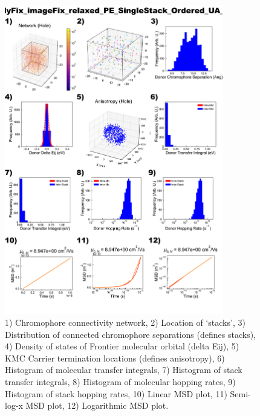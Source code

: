 \documentclass[12pt]{article}
\begin{document}
\begin{figure}[h]\centering
	\includegraphics[width=0.85\textwidth]{Figures/PE_SingleStack_Ordered.png}
    \caption{   1) Chromophore connectivity network, 
                2) Location of `stacks', 
                3) Distribution of connected chromophore separations (defines stacks),
                4) Density of states of Frontier molecular orbital (delta Eij),
                5) KMC Carrier termination locations (defines anisotropy),
                6) Histogram of molecular transfer integrals,
                7) Histogram of stack transfer integrals,
                8) Histogram of molecular hopping rates,
                9) Histogram of stack hopping rates,
                10) Linear MSD plot,
                11) Semi-log-x MSD plot,
                12) Logarithmic MSD plot.}
	\label{fig:PESingOrd}
\end{figure}
\end{document}

